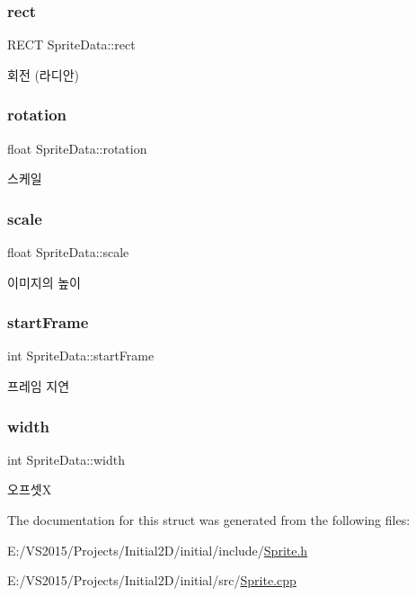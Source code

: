 \subsubsection{\texorpdfstring{rect}{rect}}
{\footnotesize\ttfamily R\+E\+CT Sprite\+Data\+::rect}

회전 (라디안) \mbox{\label{struct_sprite_data_a5c3cfa30dfc1cef21c37ba693767cb3e}} 
\subsubsection{\texorpdfstring{rotation}{rotation}}
{\footnotesize\ttfamily float Sprite\+Data\+::rotation}

스케일 \mbox{\label{struct_sprite_data_a4122649415fc55f92bf9c873e965c479}} 
\subsubsection{\texorpdfstring{scale}{scale}}
{\footnotesize\ttfamily float Sprite\+Data\+::scale}

이미지의 높이 \mbox{\label{struct_sprite_data_a398dc40ccfdba9c995b6bda139b86079}} 
\subsubsection{\texorpdfstring{startFrame}{startFrame}}
{\footnotesize\ttfamily int Sprite\+Data\+::start\+Frame}

프레임 지연 \mbox{\label{struct_sprite_data_a899b89f399a7e60b5e45e318736c39be}} 
\subsubsection{\texorpdfstring{width}{width}}
{\footnotesize\ttfamily int Sprite\+Data\+::width}

오프셋X 

The documentation for this struct was generated from the following files\+:\begin{DoxyCompactItemize}
\item 
E\+:/\+V\+S2015/\+Projects/\+Initial2\+D/initial/include/\mbox{\hyperlink{_sprite_8h}{Sprite.\+h}}\item 
E\+:/\+V\+S2015/\+Projects/\+Initial2\+D/initial/src/\mbox{\hyperlink{_sprite_8cpp}{Sprite.\+cpp}}\end{DoxyCompactItemize}
